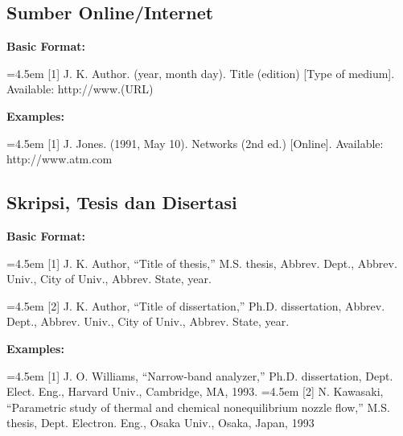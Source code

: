 \subsection*{Sumber Online/Internet}

\textbf{Basic Format:}

\hangindent=4.5em
[1] J. K. Author. (year, month day). Title (edition) [Type of medium]. Available: 
http://www.(URL)

\textbf{Examples:}

\hangindent=4.5em
[1] J. Jones. (1991, May 10). Networks (2nd ed.) [Online]. Available: 
http://www.atm.com

\subsection*{Skripsi, Tesis dan Disertasi}

\textbf{Basic Format:}

\hangindent=4.5em
[1] J. K. Author, “Title of thesis,” M.S. thesis, Abbrev. Dept., Abbrev. Univ., City of Univ., Abbrev. State, year.

\hangindent=4.5em
[2] J. K. Author, “Title of dissertation,” Ph.D. dissertation, Abbrev. Dept., Abbrev. Univ., City of Univ., Abbrev. State, year.

\textbf{Examples:}

\hangindent=4.5em
[1] J. O. Williams, “Narrow-band analyzer,” Ph.D. dissertation, Dept. Elect. Eng., 
Harvard Univ., Cambridge, MA, 1993.
\hangindent=4.5em
[2] N. Kawasaki, “Parametric study of thermal and chemical nonequilibrium nozzle 
flow,” M.S. thesis, Dept. Electron. Eng., Osaka Univ., Osaka, Japan, 1993